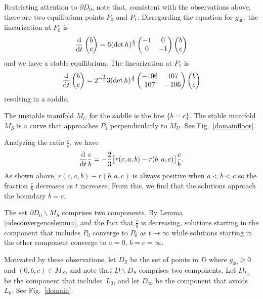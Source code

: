 \documentclass[pdftex]{sigma}
\numberwithin{equation}{section}
\newcommand{\dtime}{\frac{{\rm d}}{{\rm d} t}} %
\begin{document}
Restricting attention to $\partial D_0$, note that, consistent with the observations above, there are two equilibrium points $P_0$ and $P_1$. Disregarding the equation for $g_{00}$, the linearization at $P_0$ is
\[
\dtime \begin{pmatrix}
	b \\
	c
	\end{pmatrix}
		= 6 (\det h)^{\frac{4}{3}} \begin{pmatrix}
				-1 & 0 \\
				0 & -1
				\end{pmatrix}
				\begin{pmatrix}
					b \\
					c
					\end{pmatrix}
\]
and we have a stable equilibrium. The linearization at $P_1$ is				
\[
\dtime \begin{pmatrix}
	b \\
	c
	\end{pmatrix}
		= 2^{-\frac{7}{3}} 3 (\det h)^{\frac{4}{3}} \begin{pmatrix}
				-106 & 107 \\
				107 & -106
				\end{pmatrix}
				\begin{pmatrix}
					b \\
					c
					\end{pmatrix}
\]
resulting in a saddle.

The unstable manifold $M_U$ for the saddle is the line $\{b = c\}$. The stable manifold $M_S$ is a curve that approaches $P_1$ perpendicularly to $M_U$. See Fig.~\ref{domainfloor}.

Analyzing the ratio $\frac{c}{b}$, we have
\[
\dtime \frac{c}{b} = -\frac{2}{3} \bigl[r(c, a, b) - r(b, a, c) \bigr] \frac{c}{b}.
\]
As shown above, $r(c, a, b) - r(b, a, c)$ is always positive when $a < b < c$ so the fraction $\frac{c}{b}$ decreases as $t$ increases. From this, we find that the solutions approach the boundary $b = c$.

The set $\partial D_0 \backslash M_S$ comprises two components. By Lemma \ref{odeconvergencelemma}, and the fact that $\frac{c}{b}$ is decreasing, solutions starting in the component that includes $P_0$ converge to $P_0$ as $t \rightarrow \infty$ while solutions starting in the other component converge to $a = 0$, $b = c = \infty$.

Motivated by these observations, let $D_S$ be the set of points in $D$ where $g_{00} \geq 0$ and $(0, b, c) \in M_S$, and note that $D \backslash D_S$ comprises two components. Let $D_{L_0}$ be the component that includes~$L_0$, and let $D_{\infty}$ be the component that avoids~$L_0$. See Fig.~\ref{domain}.
\end{document}
